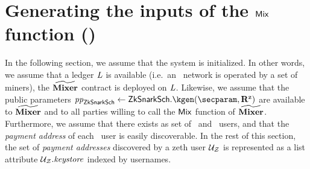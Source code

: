 
\section{Generating the inputs of the $\mathsf{Mix}$ function (\inp{\mix})}\label{zeth-protocol:mix-inp}

In the following section, we assume that the system is initialized. In other words, we assume that a ledger $\mathit{L}$ is available (i.e.~an \ethereum~network is operated by a set of miners), the $\widetilde{\mathbf{Mixer}}$ contract is deployed on $\mathit{L}$. Likewise, we assume that the public parameters $\pparams_{\zksnark} \gets \zksnark.\kgen(\secparam, \RELCIRC)$ are available to $\widetilde{\mathbf{Mixer}}$ and to all parties willing to call the $\mathsf{Mix}$ function of $\widetilde{\mathbf{Mixer}}$. Furthermore, we assume that there exists as set of \ethereum~and \zeth~users, and that the \emph{payment address} of each \zeth~user is easily discoverable. In the rest of this section, the set of \emph{payment addresses} discovered by a zeth user $\mathcal{{U}_{Z}}$ is represented as a list attribute $\mathcal{{U}_{Z}}.\mathit{keystore}$ indexed by usernames.

\medskip

